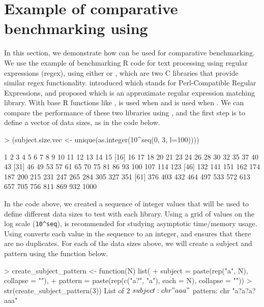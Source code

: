 \section{Example of comparative benchmarking using }
In this section, we demonstrate how  can be used for comparative benchmarking.
We use the example of benchmarking R code for text processing using regular expressions (regex), using either  or , which are two C libraries that provide similar regex functionality.
\citet{PCRE} introduced  which stands for Perl-Compatible Regular Expressions, and \citet{TRE} proposed  which is an approximate regular expression matching library.
With base R functions like ,  is used when  and  is used when .
We can compare the performance of these two libraries using , and the first step is to define a vector of data sizes, as in the code below.



\begin{Schunk}
\begin{Sinput}
> (subject.size.vec <- unique(as.integer(10^seq(0, 3, l=100))))
\end{Sinput}
\begin{Soutput}
 [1]    1    2    3    4    5    6    7    8    9   10   11   12   13   14   15
[16]   16   17   18   20   21   23   24   26   28   30   32   35   37   40   43
[31]   46   49   53   57   61   65   70   75   81   86   93  100  107  114  123
[46]  132  141  151  162  174  187  200  215  231  247  265  284  305  327  351
[61]  376  403  432  464  497  533  572  613  657  705  756  811  869  932 1000
\end{Soutput}
\end{Schunk}

In the code above, we created a sequence of integer values that will be used to define different data sizes to test with each library.
Using a grid of values on the log scale (\verb|10^seq|), is recommended for studying asymptotic time/memory usage.
Using  converts each value in the sequence to an integer, and  ensures that there are no duplicates.
For each of the data sizes above, we will create a subject and pattern using the function below.

\begin{Schunk}
\begin{Sinput}
> create_subject_pattern <- function(N) list(
+   subject = paste(rep("a", N), collapse = ""),
+   pattern = paste(rep(c("a?", "a"), each = N), collapse = ""))
> str(create_subject_pattern(3))
List of 2
 $ subject: chr "aaa"
 $ pattern: chr "a?a?a?aaa"
\end{Sinput}
\end{Schunk}

